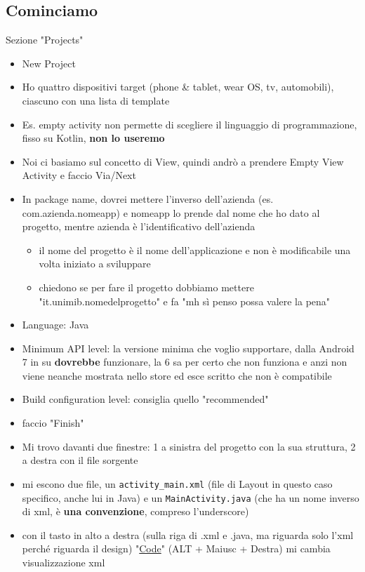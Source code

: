 \subsection{Cominciamo}
\par Sezione "Projects"
\begin{itemize}
    \item New Project
    \item Ho quattro dispositivi target (phone \& tablet, wear OS, tv, automobili), ciascuno con una lista di template
    \item Es. empty activity non permette di scegliere il linguaggio di programmazione, fisso su Kotlin, \textbf{non lo useremo}
    \item Noi ci basiamo sul concetto di View, quindi andrò a prendere Empty View Activity e faccio Via/Next
    \item In package name, dovrei mettere l'inverso dell'azienda (es. com.azienda.nomeapp) e nomeapp lo prende dal nome che ho dato al progetto, mentre azienda è l'identificativo dell'azienda
    \begin{itemize}
        \item il nome del progetto è il nome dell'applicazione e non è modificabile una volta iniziato a sviluppare
        \item chiedono se per fare il progetto dobbiamo mettere "it.unimib.nomedelprogetto" e fa "mh sì penso possa valere la pena" 
    \end{itemize}
    \item Language: Java
    \item Minimum API level: la versione minima che voglio supportare, dalla Android 7 in su \textbf{dovrebbe} funzionare, la 6 sa per certo che non funziona e anzi non viene neanche mostrata nello store ed esce scritto che non è compatibile
    \item Build configuration level: consiglia quello "recommended" 
    \item faccio "Finish"
    \item Mi trovo davanti due finestre: 1 a sinistra del progetto con la sua struttura, 2 a destra con il file sorgente
    \item mi escono due file, un \texttt{activity\_main.xml} (file di Layout in questo caso specifico, anche lui in Java) e un \texttt{MainActivity.java} (che ha un nome inverso di xml, è \textbf{una convenzione}, compreso l'underscore)
    \item con il tasto in alto a destra (sulla riga di .xml e .java, ma riguarda solo l'xml perché riguarda il design) "\underline{Code}" (ALT + Maiusc + Destra) mi cambia visualizzazione xml

\end{itemize}
